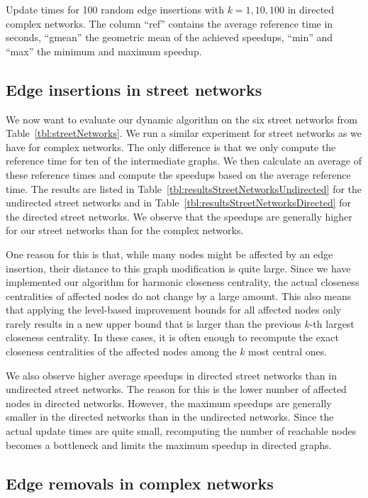 \begin{landscape}
\begin{table}[h]
\caption{Update times for 100 random edge insertions with $k = 1, 10, 100$ in directed complex networks. The column ``ref'' contains the average reference time in seconds, ``gmean'' the geometric mean of the achieved speedups, ``min'' and ``max'' the minimum and maximum speedup.}
\label{tbl:topkDirectedComplex}
\end{table}
\end{landscape}

\subsection{Edge insertions in street networks}
We now want to evaluate our dynamic algorithm on the six street networks from Table~\ref{tbl:streetNetworks}. We run a similar experiment for street networks as we have for complex networks. The only difference is that we only compute the reference time for ten of the intermediate graphs. We then calculate an average of these reference times and compute the speedups based on the average reference time. The results are listed in Table~\ref{tbl:resultsStreetNetworksUndirected} for the undirected street networks and in Table~\ref{tbl:resultsStreetNetworksDirected} for the directed street networks. We observe that the speedups are generally higher for our street networks than for the complex networks.

One reason for this is that, while many nodes might be affected by an edge insertion, their distance to this graph modification is quite large. Since we have implemented our algorithm for harmonic closeness centrality, the actual closeness centralities of affected nodes do not change by a large amount. This also means that applying the level-based improvement bounds for all affected nodes only rarely results in a new upper bound that is larger than the previous $k$-th largest closeness centrality. In these cases, it is often enough to recompute the exact closeness centralities of the affected nodes among the $k$ most central ones.

We also observe higher average speedups in directed street networks than in undirected street networks. The reason for this is the lower number of affected nodes in directed networks. However, the maximum speedups are generally smaller in the directed networks than in the undirected networks. Since the actual update times are quite small, recomputing the number of reachable nodes becomes a bottleneck and limits the maximum speedup in directed graphs.

\subsection{Edge removals in complex networks}


